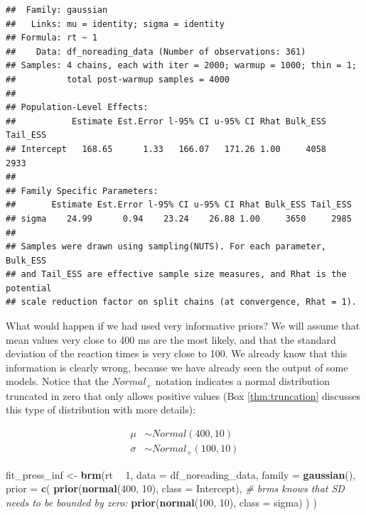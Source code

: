 \documentclass[12pt,]{krantz}
\newenvironment{Shaded}{\begin{snugshade}}{\end{snugshade}}
\newcommand{\KeywordTok}[1]{\textcolor[rgb]{0.13,0.29,0.53}{\textbf{#1}}}
\newcommand{\DataTypeTok}[1]{\textcolor[rgb]{0.13,0.29,0.53}{#1}}
\newcommand{\DecValTok}[1]{\textcolor[rgb]{0.00,0.00,0.81}{#1}}
\newcommand{\StringTok}[1]{\textcolor[rgb]{0.31,0.60,0.02}{#1}}
\newcommand{\CommentTok}[1]{\textcolor[rgb]{0.56,0.35,0.01}{\textit{#1}}}
\newcommand{\OperatorTok}[1]{\textcolor[rgb]{0.81,0.36,0.00}{\textbf{#1}}}
\newcommand{\NormalTok}[1]{#1}
\theoremstyle{definition}
\theoremstyle{definition}
\theoremstyle{definition}
\theoremstyle{remark}
\begin{document}
\begin{verbatim}
##  Family: gaussian 
##   Links: mu = identity; sigma = identity 
## Formula: rt ~ 1 
##    Data: df_noreading_data (Number of observations: 361) 
## Samples: 4 chains, each with iter = 2000; warmup = 1000; thin = 1;
##          total post-warmup samples = 4000
## 
## Population-Level Effects: 
##           Estimate Est.Error l-95% CI u-95% CI Rhat Bulk_ESS Tail_ESS
## Intercept   168.65      1.33   166.07   171.26 1.00     4058     2933
## 
## Family Specific Parameters: 
##       Estimate Est.Error l-95% CI u-95% CI Rhat Bulk_ESS Tail_ESS
## sigma    24.99      0.94    23.24    26.88 1.00     3650     2985
## 
## Samples were drawn using sampling(NUTS). For each parameter, Bulk_ESS
## and Tail_ESS are effective sample size measures, and Rhat is the potential
## scale reduction factor on split chains (at convergence, Rhat = 1).
\end{verbatim}

What would happen if we had used very informative priors? We will assume
that mean values very close to 400 ms are the most likely, and that the
standard deviation of the reaction times is very close to 100. We
already know that this information is clearly wrong, because we have
already seen the output of some models. Notice that the \(Normal_+\)
notation indicates a normal distribution truncated in zero that only
allows positive values (Box \ref{thm:truncation} discusses this type of
distribution with more details):

\begin{equation}
\begin{aligned}
\mu &\sim Normal(400, 10) \\
\sigma &\sim Normal_+(100, 10) 
\end{aligned}
\label{eq:infrtpriors}
\end{equation}

\begin{Shaded}
\begin{Highlighting}[]
\NormalTok{fit_press_inf <-}\StringTok{ }\KeywordTok{brm}\NormalTok{(rt }\OperatorTok{~}\StringTok{ }\DecValTok{1}\NormalTok{,}
  \DataTypeTok{data =}\NormalTok{ df_noreading_data,}
  \DataTypeTok{family =} \KeywordTok{gaussian}\NormalTok{(),}
  \DataTypeTok{prior =} \KeywordTok{c}\NormalTok{(}
    \KeywordTok{prior}\NormalTok{(}\KeywordTok{normal}\NormalTok{(}\DecValTok{400}\NormalTok{, }\DecValTok{10}\NormalTok{), }\DataTypeTok{class =}\NormalTok{ Intercept),}
    \CommentTok{# brms knows that SD needs to be bounded by zero:}
    \KeywordTok{prior}\NormalTok{(}\KeywordTok{normal}\NormalTok{(}\DecValTok{100}\NormalTok{, }\DecValTok{10}\NormalTok{), }\DataTypeTok{class =}\NormalTok{ sigma)}
\NormalTok{  )}
\NormalTok{)}
\end{Highlighting}
\end{Shaded}
\end{document}

